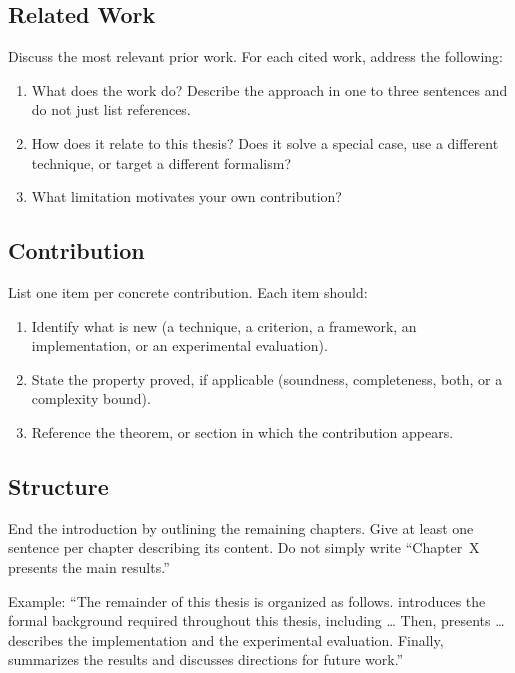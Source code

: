 
\subsection*{Related Work}

Discuss the most relevant prior work.
For each cited work, address the following:
\begin{enumerate}
    \item What does the work do? Describe the approach in one to three
          sentences and do not just list references.
    \item How does it relate to this thesis? Does it solve a special case,
          use a different technique, or target a different formalism?
    \item What limitation motivates your own contribution?
\end{enumerate}


\subsection*{Contribution}

List one item per concrete contribution. 
Each item should:
\begin{enumerate}
    \item Identify what is new (a technique, a criterion, a framework, an
          implementation, or an experimental evaluation).
    \item State the property proved, if applicable (soundness, completeness,
          both, or a complexity bound).
    \item Reference the theorem, or section in which the contribution appears.
\end{enumerate}


\subsection*{Structure}

End the introduction by outlining the remaining chapters.
Give at least one sentence per chapter describing its content. 
Do not simply write ``Chapter~X presents the main results.'' 

Example: ``The remainder of this thesis is organized as follows.
 introduces the formal background required throughout
this thesis, including \ldots
Then,  presents \ldots
{} describes the implementation and the experimental
evaluation.
Finally,  summarizes the results and discusses directions for
future work.''